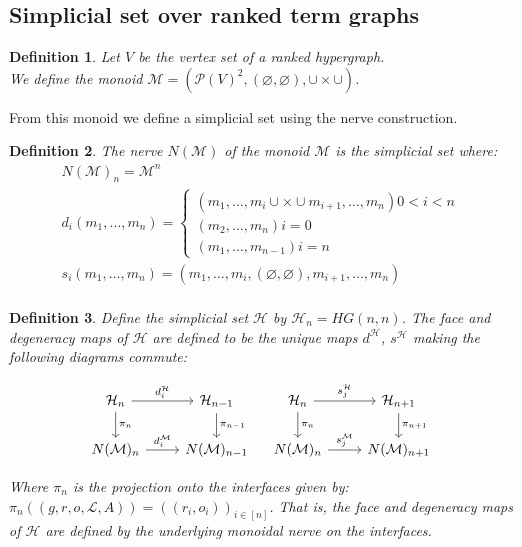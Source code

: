 \documentclass[12pt]{article}
\newtheorem{definition}{Definition}[section]
\renewcommand{\P}{\mathcal{P}}
\newcommand{\1}{\mathbbm{1}}
\renewcommand{\L}{\mathcal{L}}
\newcommand{\M}{\mathcal{M}}
\renewcommand{\H}{\mathcal{H}}
\begin{document}
\subsection{Simplicial set over ranked term graphs}
\begin{definition}
    Let $V$ be the vertex set of a ranked hypergraph.\\
    We define the monoid $\M = (\P(V)^2, (\varnothing, \varnothing), \cup\times\cup)$. 
\end{definition}

From this monoid we define a simplicial set using the nerve construction.

\begin{definition}
    The \emph{nerve} $N(\M)$ of the monoid $\M$ is the simplicial set where:
    \begin{align*}
        N(\M)_n = \M^n\\
        d_i(m_1,\dots,m_n) = 
        \begin{cases}
            (m_1,\dots,m_i \cup\times\cup m_{i+1}, \dots, m_n)  0 < i < n\\
            (m_2,\dots, m_n)  i = 0\\
            (m_1,\dots,m_{n-1})  i = n
        \end{cases}\\
        s_i(m_1,\dots,m_n) = (m_1, \dots, m_i, (\varnothing, \varnothing), m_{i+1}, \dots, m_n)\\
    \end{align*}
\end{definition}

\begin{definition}
Define the simplicial set $\H$ by $\H_n = HG(n,n)$. The face and degeneracy maps of $\H$ are defined to be the unique maps $d^{\H}$, $s^{\H}$ making the following diagrams commute:

\[
\begin{tikzcd}
\H_n \arrow{r}{d_i^{\H}} \arrow{d}{\pi_n} & \H_{n-1} \arrow{d}{\pi_{n-1}} \\
N(\M)_n \arrow{r}{d_i^\M} & N(\M)_{n-1}
\end{tikzcd}
\quad
\begin{tikzcd}
\H_n \arrow{r}{s_j^{\H}} \arrow{d}{\pi_n} & \H_{n+1} \arrow{d}{\pi_{n+1}} \\
N(\M)_n \arrow{r}{s_j^\M} & N(\M)_{n+1}
\end{tikzcd}
\]

Where $\pi_n$ is the projection onto the interfaces given by: $\pi_n((g, r, o, \L, A)) = ((r_i, o_i))_{i\in [n]}$. That is, the face and degeneracy maps of $\H$ are defined by the underlying monoidal nerve on the interfaces.
\end{definition}
\end{document}
